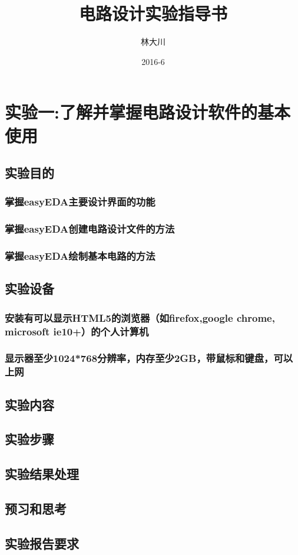 \documentclass[11pt,a4paper]{book}
\begin{document}
\title{电路设计实验指导书}
\author{林大川}
\date{2016-6}
\maketitle
\chapter{实验一:了解并掌握电路设计软件的基本使用}
\section{实验目的}
\subsection{掌握easyEDA主要设计界面的功能}
\subsection{掌握easyEDA创建电路设计文件的方法}
\subsection{掌握easyEDA绘制基本电路的方法}
\section{实验设备}
\subsection{安装有可以显示HTML5的浏览器（如firefox,google chrome, microsoft ie10+）的个人计算机}
\subsection{显示器至少1024*768分辨率，内存至少2GB，带鼠标和键盘，可以上网}
\section{实验内容}
\section{实验步骤}
\section{实验结果处理}
\section{预习和思考}
\section{实验报告要求}
\end{document}
